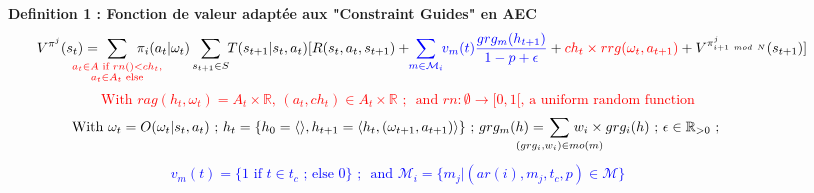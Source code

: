 \documentclass[sigconf,anonymous]{aamas}
\begin{document}
\begin{figure*}[h!]
  \label{eq:single_value_function}
  \raggedright
  \textbf{\quad Definition 1 : Fonction de valeur adaptée aux "Constraint Guides" en AEC}
  \begin{gather*}
    \text{\quad \quad} V^{\pi^j}(s_t) = \hspace{-0.75cm} \sum_{\textcolor{red}{ \substack{a_{t} \in A \text{ if } rn() < ch_{t}, \\ 
    a_{t} \in A_{t} \text{ else}}
    }}{\hspace{-0.7cm} \pi_i(a_{t} | \omega_t)} \sum_{s_{t+1} \in S}{\hspace{-0.1cm} T(s_{t+1} | s_t, a_{t})[R(s_t,a_{t},s_{t+1}) + \hspace{-0.1cm} \textcolor{blue}{ \sum_{m \in \mathcal{M}_i}{ \hspace{-0.1cm} v_m(t) \frac{grg_m(h_{t+1})}{1 - p + \epsilon} } } + \textcolor{red}{ch_t \times rrg(\omega_t,a_{t+1})} + V^{\pi^j_{i+1 \ mod \ N}}(s_{t+1})]}
  \end{gather*}  
  \textcolor{red}{\[\text{With } rag(h_t, \omega_t) = A_{t} \times \mathbb{R} \text{, } (a_t, ch_{t}) \in A_{t} \times \mathbb{R} \text{ ; } \text{ and } rn: \emptyset \to [0,1[ \text{, a uniform random function}\]}
  \vspace{-0.5cm}
  \textcolor{blue}{
  \begin{gather*}
  \text{With } \omega_t = O(\omega_t | s_t, a_t) \text{ ; } h_t = \{h_0 = \langle \rangle, h_{t+1} = \langle h_t, (\omega_{t+1}, a_{t+1}) \rangle \} \text{ ; } grg_m(h) = \hspace{-0.8cm} \sum_{(grg_i,w_i) \in mo(m)}{\hspace{-0.8cm} w_i \times grg_i(h)} \text{ ; } \epsilon \in \mathbb{R}_{>0} \text{ ; }
  \end{gather*}
  }
  \vspace{-0.75cm}
  \textcolor{blue}{
  \begin{gather*}
  v_m(t) = \{ 1 \text{ if } t \in t_c \text{ ; else } 0 \} \text{ ; } \text{ and } \mathcal{M}_i = \{m_j | (ar(i),m_j,t_c,p) \in \mathcal{M}\}
  \end{gather*}
  }
  \vspace{-0.6cm}
  \end{figure*}
\end{document}
